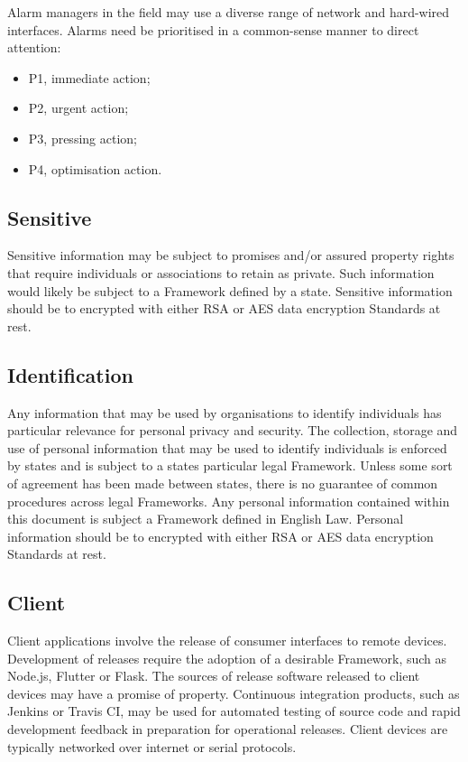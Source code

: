 \documentclass[11pt, oneside]{article}   	%
\begin{document}
Alarm managers in the field may use a diverse range of network and hard-wired interfaces.
Alarms need be prioritised in a common-sense manner to direct attention:

\begin{itemize}
	\item P1, immediate action; 
	\item P2, urgent action;
	\item P3, pressing action;
	\item P4, optimisation action.
\end{itemize}

\subsection{Sensitive}
Sensitive information may be subject to promises and/or assured property rights that require individuals or associations to retain as private.
Such information would likely be subject to a Framework defined by a state.
Sensitive information should be to encrypted with either RSA or AES data encryption Standards at rest.

\subsection{Identification}
Any information that may be used by organisations to identify individuals has particular relevance for personal privacy and security.
The collection, storage and use of personal information that may be used to identify individuals is enforced by states and is subject to a states particular legal Framework.
Unless some sort of agreement has been made between states, there is no guarantee of common procedures across legal Frameworks.
Any personal information contained within this document is subject a Framework defined in English Law.
Personal information should be to encrypted with either RSA or AES data encryption Standards at rest.

\subsection{Client}
Client applications involve the release of consumer interfaces to remote devices.
Development of releases require the adoption of a desirable Framework, such as Node.js, Flutter or Flask.
The sources of release software released to client devices may have a promise of property.
Continuous integration products, such as Jenkins or Travis CI, may be used for automated testing of source code and rapid development feedback in preparation for operational releases.
Client devices are typically networked over internet or serial protocols.\
\end{document}
